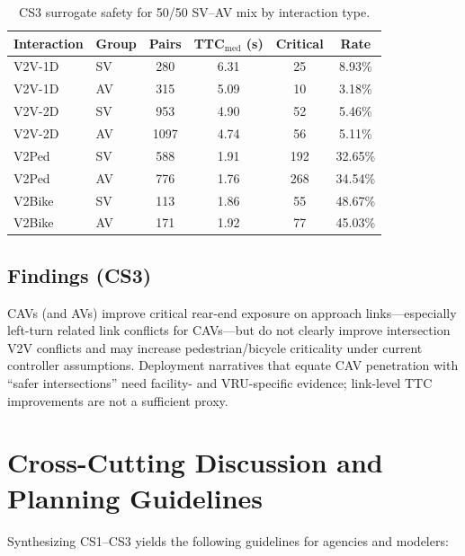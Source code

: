 \documentclass[numbered]{trbunofficial}
\begin{document}
\begin{table}[htbp]
  \centering
  \caption{CS3 surrogate safety for 50/50 SV--AV mix by interaction type.}
  \label{tab:cs3_av}
  \small
  \begin{tabular}{@{}llcccc@{}}
    \toprule
    Interaction & Group & Pairs & TTC$_{\mathrm{med}}$ (s) & Critical & Rate \\
    \midrule
    V2V-1D & SV & 280 & 6.31 & 25 & 8.93\% \\
    V2V-1D & AV & 315 & 5.09 & 10 & 3.18\% \\
    V2V-2D & SV & 953 & 4.90 & 52 & 5.46\% \\
    V2V-2D & AV & 1097 & 4.74 & 56 & 5.11\% \\
    V2Ped & SV & 588 & 1.91 & 192 & 32.65\% \\
    V2Ped & AV & 776 & 1.76 & 268 & 34.54\% \\
    V2Bike & SV & 113 & 1.86 & 55 & 48.67\% \\
    V2Bike & AV & 171 & 1.92 & 77 & 45.03\% \\
    \bottomrule
  \end{tabular}
\end{table}

\subsection{Findings (CS3)}
CAVs (and AVs) improve critical rear-end exposure on approach links---especially left-turn
related link conflicts for CAVs---but do not clearly improve intersection V2V conflicts and
may increase pedestrian/bicycle criticality under current controller assumptions. Deployment
narratives that equate CAV penetration with ``safer intersections'' need facility- and
VRU-specific evidence; link-level TTC improvements are not a sufficient proxy.

\section{Cross-Cutting Discussion and Planning Guidelines}
\label{sec:discuss}
Synthesizing CS1--CS3 yields the following guidelines for agencies and modelers:
\end{document}
